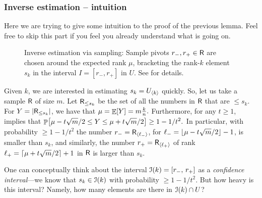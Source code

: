 \subsubsection{Inverse estimation -- intuition}

Here we are trying to give some intuition to the proof of the previous
lemma. Feel free to skip this part if you feel you already understand
what is going on.

\begin{figure}[t]
    \centering
    \caption{Inverse estimation via sampling: Sample pivots $r_-,
      r_+ \in \mathsf{R}$ are chosen around the expected rank $\mu$,
      bracketing the rank-$k$ element $s_k$ in the interval $I = [r_-,
      r_+]$ in $U$. See  for details.}
\end{figure}


Given $k$, we are interested in estimating $s_k = U_{\langle k\rangle}$
quickly. So, let us take a sample $\mathsf{R}$ of size $m$. Let
$\mathsf{R}_{\leq s_k}$ be the set of all the numbers in $\mathsf{R}$ that
are $\leq s_k$. For $Y = \left| {\mathsf{R}_{\leq s_k}} \right|$, we have that
\begin{math}
  \mu = \mathop{\mathbb{E}}\!\left[ {Y} \right] = m \frac{k}{n}.
\end{math}
Furthermore, for any $t\geq 1$,  implies that
\begin{math}
    \ds%
    \Prob{ \mu - t \sqrt{m}/2 \leq Y \leq \mu + t \sqrt{m}/2 } \geq 1-
    {1}/{t^2}.
\end{math}
In particular, with probability $\geq 1- 1/t^2$ the number
$r_{-} =\mathsf{R}_{\langle\ell_-\rangle}$, for
$\ell_{-} = \left\lfloor {\mu - t \sqrt{m}/2 } \right\rfloor-1$, is smaller than $s_k$, and
similarly, the number $r_{+} = \mathsf{R}_{\langle\ell_{+}\rangle}$ of rank
$\ell_{+} = \left\lceil {\mu + t \sqrt{m}/2 } \right\rceil+1$ in $\mathsf{R}$ is larger than
$s_k$.

One can conceptually think about the interval
\begin{math}
    \Interval(k) = [r_-,\, r_+ ]%
\end{math}
as a \emph{confidence interval}---we know that $s_k \in \EuScript{I}(k)$
with probability $\geq 1-1/t^2$. But how heavy is this interval?  Namely,
how many elements are there in $\EuScript{I}(k) \cap U$?

